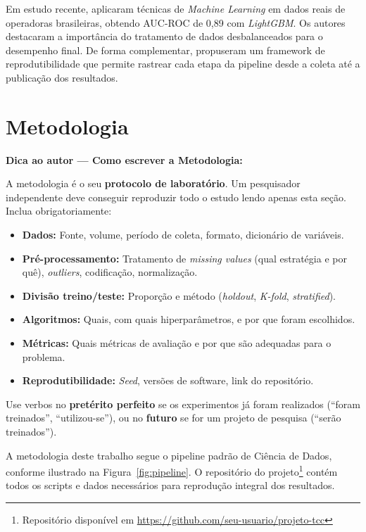 \documentclass[
    article,
    12pt,
    oneside,
    a4paper,
    english,
    brazilian
    ]{abntex2}
\numberwithin{equation}{section}
\newenvironment{dica}{%
    \par\medskip
    \color{blue!60!black}\small\itshape
}{%
    \par\medskip
}
\begin{document}
Em estudo recente,  aplicaram técnicas de \textit{Machine Learning} em dados reais de operadoras brasileiras, obtendo AUC-ROC de 0,89 com \textit{LightGBM}. Os autores destacaram a importância do tratamento de dados desbalanceados para o desempenho final. De forma complementar,  propuseram um framework de reprodutibilidade que permite rastrear cada etapa da pipeline desde a coleta até a publicação dos resultados.

\section{Metodologia}

\begin{dica}
\noindent\textbf{Dica ao autor — Como escrever a Metodologia:}

A metodologia é o seu \textbf{protocolo de laboratório}. Um pesquisador independente deve conseguir reproduzir todo o estudo lendo apenas esta seção. Inclua obrigatoriamente:
\begin{itemize}
    \item \textbf{Dados:} Fonte, volume, período de coleta, formato, dicionário de variáveis.
    \item \textbf{Pré-processamento:} Tratamento de \textit{missing values} (qual estratégia e por quê), \textit{outliers}, codificação, normalização.
    \item \textbf{Divisão treino/teste:} Proporção e método (\textit{holdout}, \textit{K-fold}, \textit{stratified}).
    \item \textbf{Algoritmos:} Quais, com quais hiperparâmetros, e por que foram escolhidos.
    \item \textbf{Métricas:} Quais métricas de avaliação e por que são adequadas para o problema.
    \item \textbf{Reprodutibilidade:} \textit{Seed}, versões de software, link do repositório.
\end{itemize}
Use verbos no \textbf{pretérito perfeito} se os experimentos já foram realizados (``foram treinados'', ``utilizou-se''), ou no \textbf{futuro} se for um projeto de pesquisa (``serão treinados'').
\end{dica}

A metodologia deste trabalho segue o pipeline padrão de Ciência de Dados, conforme ilustrado na Figura~\ref{fig:pipeline}. O repositório do projeto\footnote{Repositório disponível em \url{https://github.com/seu-usuario/projeto-tcc}} contém todos os scripts e dados necessários para reprodução integral dos resultados.
\end{document}
